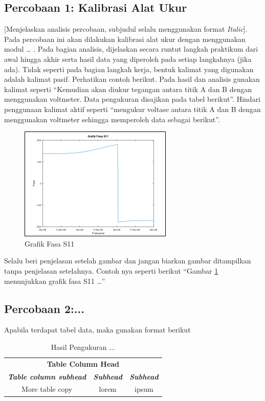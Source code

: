 \documentclass[conference]{IEEEtran}
\begin{document}
\subsection{Percobaan 1: Kalibrasi Alat Ukur}

[Menjelaskan analisis percobaan, subjudul selalu menggunakan format \textit{Italic}].\\

Pada percobaan ini akan dilakukan kalibrasi alat ukur dengan menggunakan modul … . Pada bagian analisis, dijelaskan secara runtut langkah praktikum dari awal hingga akhir serta hasil data yang diperoleh pada setiap langkahnya (jika ada). Tidak seperti pada bagian langkah kerja, bentuk kalimat yang digunakan adalah kalimat pasif. Perhatikan contoh berikut. Pada hasil dan analisis gunakan kalimat seperti “Kemudian akan diukur tegangan antara titik A dan B dengan menggunakan voltmeter. Data pengukuran disajikan pada tabel berikut”. Hindari penggunaan kalimat aktif seperti “mengukur voltase antara titik A dan B dengan menggunakan voltmeter sehingga memperoleh data sebagai berikut”.

\begin{figure}[htbp]
\centerline{\includegraphics{./Figures/s11.png}}
\caption{Grafik Fasa S11}
\label{fig2}
\end{figure}

Selalu beri penjelasan setelah gambar dan jangan biarkan gambar ditampilkan tanpa penjelasan setelahnya. Contoh nya seperti berikut “Gambar \ref{fig2} menunjukkan grafik fasa S11 …”

\subsection{Percobaan 2:...}
Apabila terdapat tabel data, maka gunakan format berikut

\begin{table}[htbp]
\caption{Hasil Pengukuran ...}
\begin{center}
\begin{tabular}{|c|c|c|}
\hline
\multicolumn{3}{|c|}{\textbf{Table Column Head}} \\
\cline{1-3} 
\textbf{\textit{Table column subhead}}& \textbf{\textit{Subhead}}& \textbf{\textit{Subhead}} \\
\hline
 More table copy & lorem & ipsum  \\
\hline
\end{tabular}
\label{tab1}
\end{center}
\end{table}
\end{document}
